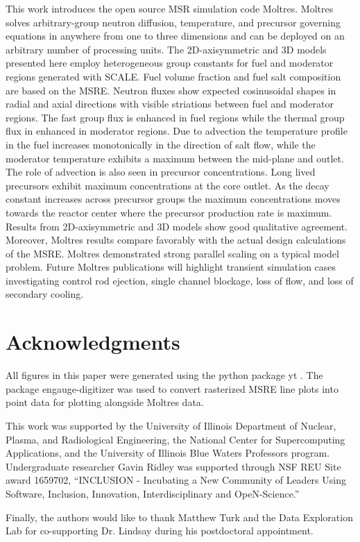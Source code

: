 \documentclass{article}
\let\Oldsection\section
\renewcommand{\section}{\FloatBarrier\Oldsection}
\begin{document}
This work introduces the open source \gls{MSR} simulation code Moltres. Moltres
solves arbitrary-group neutron diffusion, temperature, and precursor governing
equations in anywhere from one to three dimensions and can be deployed on an
arbitrary number of processing units. The 2D-axisymmetric and 3D models
presented here employ heterogeneous group constants for fuel and moderator
regions generated with SCALE. Fuel volume fraction and fuel salt composition are
based on the \gls{MSRE}. Neutron fluxes show expected cosinusoidal shapes in
radial and axial directions with visible striations between fuel and moderator
regions. The fast group flux is enhanced in fuel regions while the thermal group
flux in enhanced in moderator regions. Due to advection the temperature profile
in the fuel increases monotonically in the direction of salt flow, while the
moderator temperature exhibits a maximum between the mid-plane and outlet. The
role of advection is also seen in precursor concentrations. Long lived
precursors exhibit maximum concentrations at the core outlet. As the decay
constant increases across precursor groups the maximum concentrations moves
towards the reactor center where the precursor production rate is
maximum. Results from 2D-axisymmetric and 3D models show good qualitative
agreement. Moreover, Moltres results compare favorably with the actual design
calculations of the \gls{MSRE}. Moltres demonstrated strong parallel scaling on a
typical model problem. Future Moltres publications will highlight
transient simulation cases investigating control rod ejection, single channel
blockage, loss of flow, and loss of secondary cooling.

\FloatBarrier

\section{Acknowledgments}

All figures in this paper were generated using the python package yt
\cite{turk_yt:_2011}. The package engauge-digitizer
\cite{mark_mitchell_markummitchell/engauge-digitizer:_2017} was used to convert
rasterized \gls{MSRE} line plots into point data for plotting alongside Moltres
data.

This work was supported by the University of Illinois Department of Nuclear,
Plasma, and Radiological Engineering, the National Center for Supercomputing
Applications, and the University of Illinois Blue Waters Professors program.
Undergraduate researcher Gavin Ridley was supported through NSF REU Site award
1659702, ``INCLUSION - Incubating a New Community of Leaders Using Software,
Inclusion, Innovation, Interdisciplinary and OpeN-Science.''

Finally, the authors would like to thank Matthew Turk and the Data Exploration
Lab for co-supporting Dr. Lindsay during his postdoctoral appointment.

\clearpage
\printglossary[type=\acronymtype]


\end{document}

